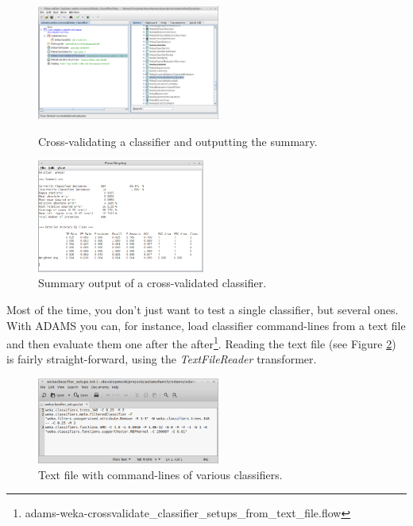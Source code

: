 \begin{figure}[ht]
  \begin{minipage}[t]{0.5\linewidth}
    \centering
    \includegraphics[width=6.0cm]{images/basic-crossvalidate1-flow.png}
    \caption{Cross-validating a classifier and outputting the summary.}
    \label{basic-crossvalidate1-flow}
  \end{minipage}
  \hspace{0.5cm}
  \begin{minipage}[t]{0.5\linewidth}
    \centering
    \includegraphics[width=5.5cm]{images/basic-crossvalidate1-output.png}
    \caption{Summary output of a cross-validated classifier.}
    \label{basic-crossvalidate1-output}
  \end{minipage}
\end{figure}

Most of the time, you don't just want to test a single classifier, but several
ones. With ADAMS you can, for instance, load classifier command-lines from a
text file and then evaluate them one after the
after\footnote{adams-weka-crossvalidate\_classifier\_setups\_from\_text\_file.flow}.
Reading the text file (see Figure
\ref{basic-crossvalidate_multiple_files-setups}) is fairly straight-forward,
using the \textit{TextFileReader} transformer.

\begin{figure}[htb]
  \centering
  \includegraphics[width=6.0cm]{images/basic-crossvalidate_multiple_files-setups.png}
  \caption{Text file with command-lines of various classifiers.}
  \label{basic-crossvalidate_multiple_files-setups}
\end{figure}

